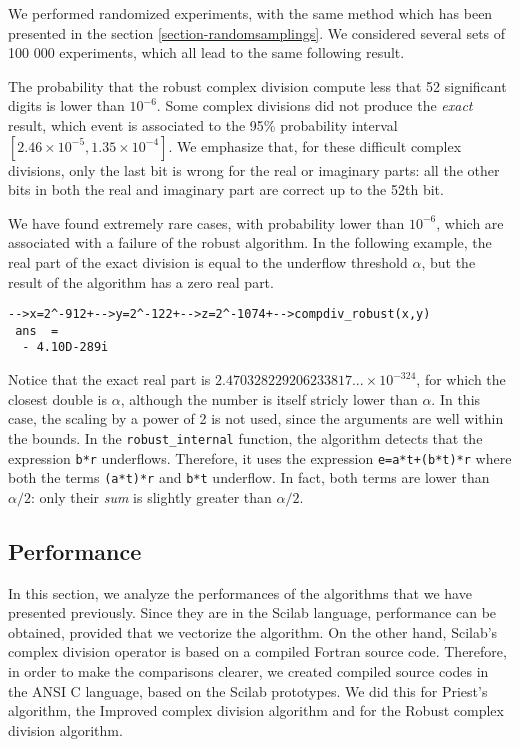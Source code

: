 \documentclass{paper}
\newcommand{\scifun}[1]{\texttt{#1}}
\newcommand{\scivar}[1]{\texttt{#1}}
\begin{document}
We performed randomized experiments, with the same 
method which has been presented in the section \ref{section-randomsamplings}. 
We considered several sets of 100 000 experiments, which all lead to the 
same following result. 

The probability that the robust complex division compute less that 52 
significant digits is lower than $10^{-6}$. 
Some complex divisions did not produce the \emph{exact} result, 
which event is associated to the 95\% probability 
interval $[2.46\times 10^{-5},1.35\times 10^{-4}]$.
We emphasize that, for these difficult complex divisions,
only the last bit is wrong for the real or imaginary 
parts: all the other bits in both the real and imaginary part 
are correct up to the 52th bit.

We have found extremely rare cases, with probability lower than $10^{-6}$, 
which are associated with a failure of the robust algorithm. 
In the following example, the real part of the exact division is 
equal to the underflow threshold $\alpha$, but the result of the 
algorithm has a zero real part.
\lstset{language=scilabscript}
\begin{lstlisting}
-->x=2^-912+-->y=2^-122+-->z=2^-1074+-->compdiv_robust(x,y)
 ans  =
  - 4.10D-289i  
\end{lstlisting}
Notice that the exact real part is $2.470328229206233817... \times 10^{-324}$, 
for which the closest double is $\alpha$, although the number is itself 
stricly lower than $\alpha$.
In this case, the scaling by a power of 2 is not used, since the 
arguments are well within the bounds. 
In the \scifun{robust\_internal} function, the algorithm detects that the 
expression \scivar{b*r} underflows. 
Therefore, it uses the expression \scivar{e=a*t+(b*t)*r} where both 
the terms \scivar{(a*t)*r} and \scivar{b*t} underflow. 
In fact, both terms are lower than $\alpha/2$: 
only their \emph{sum} is slightly greater than $\alpha/2$.


\subsection{Performance}

In this section, we analyze the performances of the algorithms that we have 
presented previously.
Since they are in the Scilab language, performance can be obtained, provided that 
we vectorize the algorithm. 
On the other hand, Scilab's complex division operator is based on a compiled 
Fortran source code. 
Therefore, in order to make the comparisons clearer, we created compiled source codes in 
the ANSI C language, based on the Scilab prototypes. 
We did this for Priest's algorithm, the Improved complex division algorithm and for 
the Robust complex division algorithm.
\end{document}
